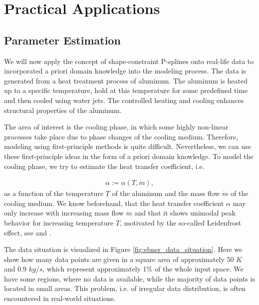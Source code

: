 \chapter{Practical Applications}

\section{Parameter Estimation} \label{sec:real-world-application}

We will now apply the concept of shape-constraint P-splines onto real-life data to incorporated a priori domain knowledge into the modeling process. The data is generated from a heat treatment process of aluminum. The aluminum is heated up to a specific temperature, hold at this temperature for some predefined time and then cooled using water jets. The controlled heating and cooling enhances structural properties of the aluminum.

The area of interest is the cooling phase, in which some highly non-linear processes take place due to phase changes of the cooling medium. Therefore, modeling using first-principle methods is quite difficult. Nevertheless, we can use these first-principle ideas in the form of a priori domain knowledge. To model the cooling phase, we try to estimate the heat transfer coefficient, i.e.

\begin{align}
	\alpha := \alpha(T, \dot m),
\end{align}
%
as a function of the temperature $T$ of the aluminum and the mass flow $\dot m$ of the cooling medium. We know beforehand, that the heat transfer coefficient $\alpha$ may only increase with increasing mass flow $\dot m$ and that it shows unimodal peak behavior for increasing temperature $T$, motivated by the so-called Leidenfrost effect, see \cite{mayinger2013stromung} and \cite{baehr2006heatandmasstransfer}.

The data situation is visualized in Figure \ref{fig:ebner_data_situation}. Here we show how many data points are given in a square area of approximately 50 $\si{K}$ and 0.9 $\si{kg}/\si{s}$, which represent approximately 1\% of the whole input space. We have some regions, where no data is available, while the majority of data points is located in small areas. This problem, i.e. of irregular data distribution, is often encountered in real-world situations. 

